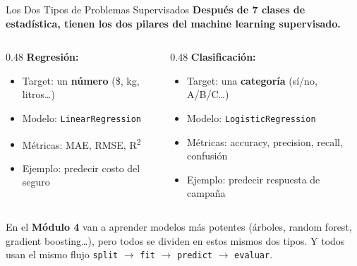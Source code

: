 \documentclass[aspectratio=169, 11pt]{beamer}
\begin{document}
\begin{frame}[shrink=5]{Los Dos Tipos de Problemas Supervisados}
  \vspace{-4pt}
  {\footnotesize\color{arcaDark}\bfseries
    Después de 7 clases de estadística, tienen los dos pilares
    del machine learning supervisado.}

  \vspace{8pt}
  \begin{columns}[T]
    \begin{column}{0.48\textwidth}
      {\footnotesize\bfseries\color{codeBlue}\faChartLine\hspace{4pt}
        Regresión:}
      \vspace{4pt}

      {\scriptsize
      \begin{itemize}\setlength{\itemsep}{4pt}
        \item Target: un \textbf{número} (\$, kg, litros\ldots)
        \item Modelo: \texttt{LinearRegression}
        \item Métricas: MAE, RMSE, R\textsuperscript{2}
        \item Ejemplo: predecir costo del seguro
      \end{itemize}
      }
    \end{column}

    \begin{column}{0.48\textwidth}
      {\footnotesize\bfseries\color{arcaRed}\faCheckCircle\hspace{4pt}
        Clasificación:}
      \vspace{4pt}

      {\scriptsize
      \begin{itemize}\setlength{\itemsep}{4pt}
        \item Target: una \textbf{categoría} (sí/no, A/B/C\ldots)
        \item Modelo: \texttt{LogisticRegression}
        \item Métricas: accuracy, precision, recall, confusión
        \item Ejemplo: predecir respuesta de campaña
      \end{itemize}
      }
    \end{column}
  \end{columns}

  \vspace{8pt}
  {\footnotesize\color{arcaDark}
    \faLightbulb\hspace{4pt}
    En el \textbf{Módulo 4} van a aprender modelos más potentes (árboles,
    random forest, gradient boosting\ldots), pero todos se dividen en
    estos mismos dos tipos. Y todos usan el mismo flujo
    \texttt{split} $\to$ \texttt{fit} $\to$ \texttt{predict} $\to$
    \texttt{evaluar}.}
\end{frame}
\end{document}
